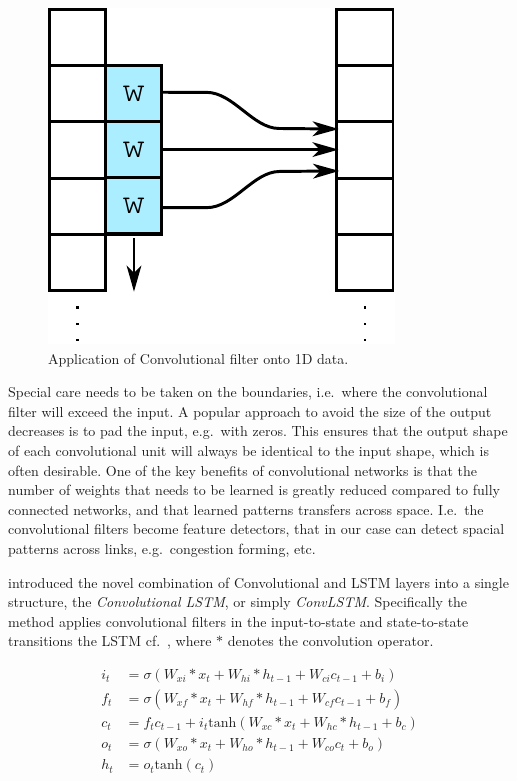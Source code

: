 \documentclass[preprint,12pt]{elsarticle}
\begin{document}
\begin{figure}[!ht]
  \centering
  \includegraphics[scale=.6]{drawings/conv.pdf}
  \caption{Application of Convolutional filter onto 1D data.}
  \label{fig:conv}
\end{figure}

Special care needs to be taken on the boundaries, i.e.\ where the convolutional filter will exceed the input. A popular approach to avoid the size of the output decreases is to pad the input, e.g.\ with zeros. This ensures that the output shape of each convolutional unit will always be identical to the input shape, which is often desirable. One of the key benefits of convolutional networks is that the number of weights that needs to be learned is greatly reduced compared to fully connected networks, and that learned patterns transfers across space. I.e.\ the convolutional filters become feature detectors, that in our case can detect spacial patterns across links, e.g.\ congestion forming, etc.   

\cite{ConvLSTM} introduced the novel combination of Convolutional and LSTM layers into a single structure, the \emph{Convolutional LSTM}, or simply \emph{ConvLSTM}. Specifically the method applies convolutional filters in the input-to-state and state-to-state transitions the LSTM cf.\ , where $*$ denotes the convolution operator.

\begin{equation}
\begin{aligned}
  i_t &= \sigma \left( W_\mathit{xi} * x_t + W_\mathit{hi} * h_{t-1} + W_{ci} c_{t-1} + b_i \right) \\
  f_t &= \sigma \left( W_\mathit{xf} * x_t + W_\mathit{hf} * h_{t-1} + W_\mathit{cf} c_{t-1} + b_f \right) \\
  c_t &= f_t c_{t-1} + i_t \mathrm{tanh} \left( W_\mathit{xc} * x_t + W_\mathit{hc} * h_{t-1} + b_c \right) \\
  o_t &= \sigma \left( W_\mathit{xo} * x_t + W_\mathit{ho} * h_{t-1} + W_\mathit{co} c_{t} + b_o \right) \\
  h_t &= o_t \mathrm{tanh} \left( c_t \right)
\end{aligned}
\label{eq:convlstm}
\end{equation}
\end{document}
